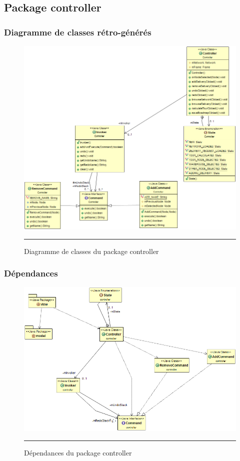 \subsection{Package controller}
\subsubsection{Diagramme de classes rétro-générés}
\begin{figure}[H]
	\centering
		\includegraphics[width=\textwidth,height=\textheight,keepaspectratio]{Figures/retro_controller}
		\rule{35em}{0.5pt}
	\caption[Diagramme de classes du package controller]{Diagramme de classes du package controller}
\end{figure}
\subsubsection{Dépendances}

\begin{figure}[H]
	\centering
		\includegraphics[width=\textwidth,height=\textheight,keepaspectratio]{Figures/retro_controller_dep}
		\rule{35em}{0.5pt}
	\caption[Dépendances du package controller]{Dépendances du package controller}
\end{figure}
